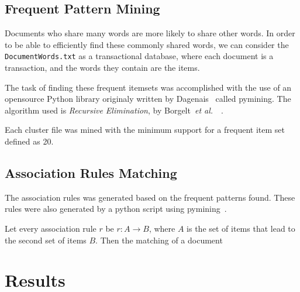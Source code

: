 \documentclass[11pt]{article}
\begin{document}
\begin{multicols}{2}
\subsection{Frequent Pattern Mining}
Documents who share many words are more likely to share other words. In order to be able to efficiently find these commonly shared words, we can consider the \texttt{DocumentWords.txt} as a transactional database, where each document is a transaction, and the words they contain are the items.

The task of finding these frequent itemsets was accomplished with the use of an opensource Python library originaly written by Dagenais~\cite{dagenais10} called pymining. The algorithm used is \emph{Recursive Elimination}, by Borgelt~\emph{et al.}~\cite{borgelt10}~\cite{borgelt05}.

Each cluster file was mined with the minimum support for a frequent item set defined as 20.

\subsection{Association Rules Matching}
The association rules was generated based on the frequent patterns found. These rules were also generated by a python script using pymining~\cite{dagenais10}.

Let every association rule $r$ be $r: A \rightarrow B$, where $A$ is the set of items that lead to the second set of items $B$. Then the matching of a document

\section{Results}




\end{multicols}
\end{document}
